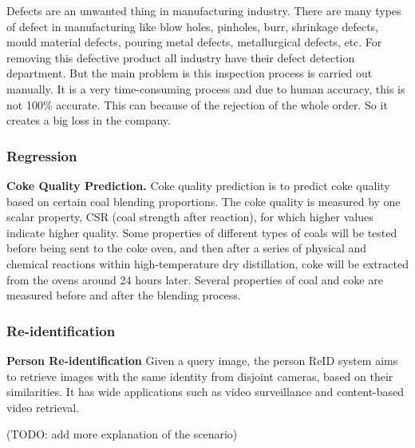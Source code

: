 Defects are an unwanted thing in manufacturing industry. There are many types of defect in manufacturing like blow holes, pinholes, burr, shrinkage defects, mould material defects, pouring metal defects, metallurgical defects, etc. For removing this defective product all industry have their defect detection department. But the main problem is this inspection process is carried out manually. It is a very time-consuming process and due to human accuracy, this is not 100\% accurate. This can because of the rejection of the whole order. So it creates a big loss in the company.


\subsubsection{Regression}
\textbf{Coke Quality Prediction.} Coke quality prediction is to predict coke quality based on certain coal blending proportions. The coke quality is measured by one scalar property, CSR (coal strength after reaction), for which higher values indicate higher quality. Some properties of different types of coals will be tested before being sent to the coke oven, and then after a series of physical and chemical reactions within high-temperature dry distillation, coke will be extracted from the ovens around 24 hours later. Several properties of coal and coke are measured before and after the blending process. 



\subsubsection{Re-identification}
\textbf{Person Re-identification} Given a query image, the person ReID system aims to retrieve images with the same identity from disjoint cameras, based on their similarities. It has wide applications such as video surveillance and content-based video retrieval. 

(TODO: add more explanation of the scenario)